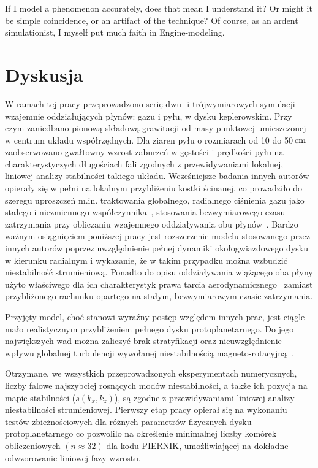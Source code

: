 \begin{savequote}[75mm]
   If I model a phenomenon accurately, does that mean I understand it? Or might
   it be simple coincidence, or an artifact of the technique? Of course, as an
   ardent simulationist, I myself put much faith in Engine-modeling.
\end{savequote}

\chapter{Dyskusja}
W ramach tej pracy przeprowadzono serię dwu- i trójwymiarowych symulacji
wzajemnie oddziałujących płynów: gazu i pyłu, w dysku keplerowskim. Przy czym
zaniedbano pionową składową grawitacji od masy punktowej umieszczonej w centrum
układu współrzędnych. Dla ziaren pyłu o rozmiarach od 10 do 50$\hbox{$\thinspace\textrm{cm}$}$
zaobserwowano gwałtowny wzrost zaburzeń w gęstości i prędkości pyłu na
charakterystyczych długościach fali zgodnych z przewidywaniami lokalnej,
liniowej analizy stabilności takiego układu. Wcześniejsze badania innych
autorów~\cite{YG05, JY07, TB09, BS10a, BS10b} opierały się w pełni na lokalnym
przybliżeniu kostki ścinanej, co prowadziło do szeregu uproszczeń m.in.
traktowania globalnego, radialnego ciśnienia gazu jako stałego i niezmiennego
współczynnika~\cite{N86}, stosowania bezwymiarowego czasu zatrzymania przy
obliczaniu wzajemnego oddziaływania obu płynów~\cite{YG05}. Bardzo ważnym
osiągnięciem poniższej pracy jest rozszerzenie modelu stosowanego przez innych
autorów poprzez uwzględnienie pełnej dynamiki okołogwiazdowego dysku w kierunku
radialnym i wykazanie, że w takim przypadku można wzbudzić niestabilność
strumieniową. Ponadto do opisu oddziaływania wiążącego oba płyny użyto
właściwego dla ich charakterystyk prawa tarcia aerodynamicznego~
zamiast przybliżonego rachunku opartego na stałym, bezwymiarowym czasie
zatrzymania.

\par Przyjęty model, choć stanowi wyraźny postęp względem innych prac, jest
ciągle mało realistycznym przybliżeniem pełnego dysku protoplanetarnego. Do jego
największych wad można zaliczyć brak stratyfikacji oraz nieuwzględnienie wpływu
globalnej turbulencji wywołanej niestabilnością magneto-rotacyjną~\cite{DKJ14}. 


\par Otrzymane, we wszystkich przeprowadzonych eksperymentach numerycznych,
liczby falowe najszybciej rosnących modów niestabilności, a także ich pozycja na
mapie stabilności ($s(k_x, k_z)$), są zgodne z przewidywaniami liniowej analizy
niestabilności strumieniowej. Pierwszy etap pracy opierał się na wykonaniu
testów zbieżnościowych dla różnych parametrów fizycznych dysku protoplanetarnego
co pozwolilo na określenie minimalnej liczby komórek obliczeniowych
$(n\approx32)$ dla kodu \textsc{PIERNIK}, umożliwiającej na dokładne odwzorowanie
liniowej fazy wzrostu. 

